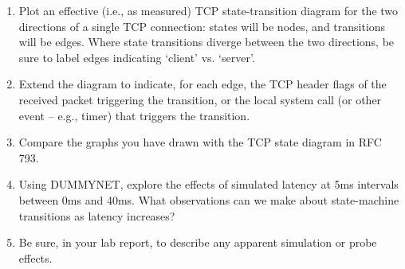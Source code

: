 \documentclass[a4paper,10pt]{article}
\begin{document}
\begin{enumerate}
  \item Plot an effective (i.e., as measured) TCP state-transition diagram for
    the two directions of a single TCP connection: states will be nodes, and
    transitions will be edges.
    Where state transitions diverge between the two directions, be sure to
    label edges indicating `client' vs. `server'.

  \item Extend the diagram to indicate, for each edge, the TCP header flags
    of the received packet triggering the transition, or the local system call
    (or other event -- e.g., timer) that triggers the transition.

  \item Compare the graphs you have drawn with the TCP state diagram in RFC
    793.

  \item Using DUMMYNET, explore the effects of simulated latency at 5ms
    intervals between 0ms and 40ms.
    What observations can we make about state-machine transitions as latency
    increases?

  \item Be sure, in your lab report, to describe any apparent simulation or
    probe effects.

\end{enumerate}
\end{document}
